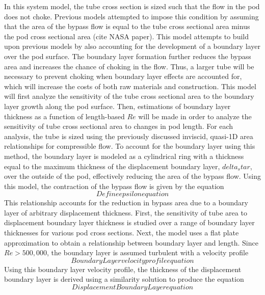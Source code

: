 In this system model, the tube cross section is sized such that the flow in the pod does not choke. Previous models attempted to impose this condition by assuming that the area of the bypass flow is equal to the tube cross sectional area minus the pod cross sectional area (cite NASA paper). This model attempts to build upon previous models by also accounting for the development of a boundary layer over the pod surface. The boundary layer formation further reduces the bypass area and increases the chance of choking in the flow. Thus, a larger tube will be necessary to prevent choking when boundary layer effects are accounted for, which will increase the costs of both raw materials and construction. This model will first analyze the sensitivity of the tube cross sectional area to the boundary layer growth along the pod surface. Then, estimations of boundary layer thickness as a function of length-based $Re$ will be made in order to analyze the sensitivity of tube cross sectional area to changes in pod length.
For each analysis, the tube is sized using the previously discussed inviscid, quasi-1D area relationships for compressible flow. To account for the boundary layer using this method, the boundary layer is modeled as a cylindrical ring with a thickness equal to the maximum thickness of the displacement boundary layer,  $delta_star$, over the outside of the pod, effectively reducing the area of the bypass flow. Using this model, the contraction of the bypass flow is given by the equation
\begin{equation}
	\label{eq:epsilon}
	Define epsilon equation
\end{equation}
This relationship accounts for the reduction in bypass area due to a boundary layer of arbitrary displacement thickness. First, the sensitivity of tube area to displacement boundary layer thickness is studied over a range of boundary layer thicknesses for various pod cross sections. Next, the model uses a flat plate approximation to obtain a relationship between boundary layer and length. Since $Re > 500,000$, the boundary layer is assumed turbulent with a velocity profile \cite{FoxAndMcDonald}
\begin{equation}
	\label{eq:boundary_layer_profile}
	Boundary Layer velocity profile equation
\end{equation}
Using this boundary layer velocity profile, the thickness of the displacement boundary layer is derived using a similarity solution to produce the equation \cite{FoxAndMcDonald}
\begin{equation}
	\label{eq:boundary_layer}
	Displacement Boundary Layer equation
\end{equation}
